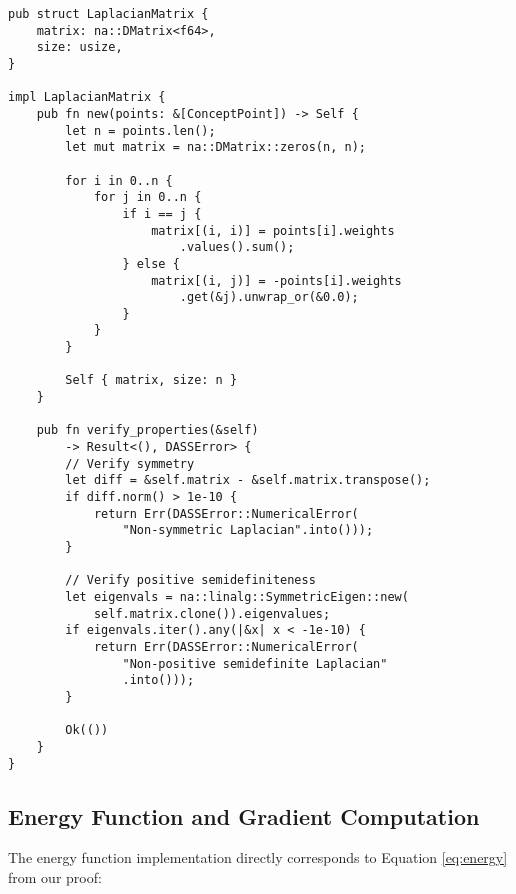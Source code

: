 \documentclass{article}
\begin{document}
\begin{verbatim}
pub struct LaplacianMatrix {
    matrix: na::DMatrix<f64>,
    size: usize,
}

impl LaplacianMatrix {
    pub fn new(points: &[ConceptPoint]) -> Self {
        let n = points.len();
        let mut matrix = na::DMatrix::zeros(n, n);
        
        for i in 0..n {
            for j in 0..n {
                if i == j {
                    matrix[(i, i)] = points[i].weights
                        .values().sum();
                } else {
                    matrix[(i, j)] = -points[i].weights
                        .get(&j).unwrap_or(&0.0);
                }
            }
        }
        
        Self { matrix, size: n }
    }
    
    pub fn verify_properties(&self) 
        -> Result<(), DASSError> {
        // Verify symmetry
        let diff = &self.matrix - &self.matrix.transpose();
        if diff.norm() > 1e-10 {
            return Err(DASSError::NumericalError(
                "Non-symmetric Laplacian".into()));
        }
        
        // Verify positive semidefiniteness
        let eigenvals = na::linalg::SymmetricEigen::new(
            self.matrix.clone()).eigenvalues;
        if eigenvals.iter().any(|&x| x < -1e-10) {
            return Err(DASSError::NumericalError(
                "Non-positive semidefinite Laplacian"
                .into()));
        }
        
        Ok(())
    }
}
\end{verbatim}

\subsection{Energy Function and Gradient Computation}
The energy function implementation directly corresponds to Equation \ref{eq:energy} from our proof:
\end{document}
